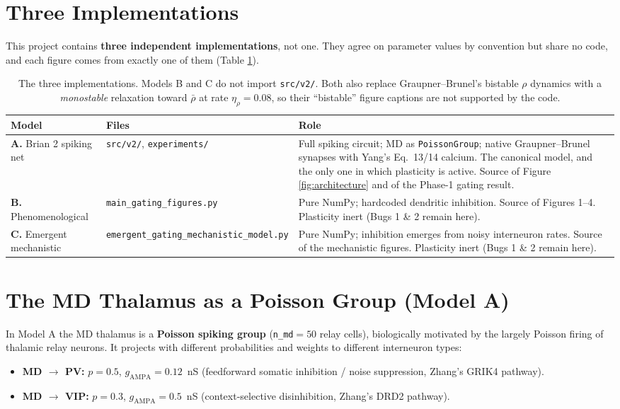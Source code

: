 \documentclass[11pt,a4paper]{article}
\begin{document}
\section{Three Implementations}
\label{sec:three}
This project contains \textbf{three independent implementations}, not one. They agree on
parameter values by convention but share no code, and each figure comes from exactly one
of them (Table \ref{tab:models}).

\begin{table}[H]
    \centering
    \small
    \begin{tabular}{@{}llp{6.2cm}@{}}
    \toprule
    \textbf{Model} & \textbf{Files} & \textbf{Role} \\ \midrule
    \textbf{A.} Brian 2 spiking net
      & \texttt{src/v2/}, \texttt{experiments/}
      & Full spiking circuit; MD as \texttt{PoissonGroup}; native Graupner--Brunel
        synapses with Yang's Eq.~13/14 calcium. The canonical model, and the only one in
        which plasticity is active. Source of Figure \ref{fig:architecture} and of the
        Phase-1 gating result. \\ \addlinespace
    \textbf{B.} Phenomenological
      & \texttt{main\_gating\_figures.py}
      & Pure NumPy; hardcoded dendritic inhibition. Source of Figures 1--4. Plasticity
        inert (Bugs 1 \& 2 remain here). \\ \addlinespace
    \textbf{C.} Emergent mechanistic
      & \texttt{emergent\_gating\_mechanistic\_model.py}
      & Pure NumPy; inhibition emerges from noisy interneuron rates. Source of the
        mechanistic figures. Plasticity inert (Bugs 1 \& 2 remain here). \\ \bottomrule
    \end{tabular}
    \caption{The three implementations. Models B and C do not import \texttt{src/v2/}.
    Both also replace Graupner--Brunel's bistable $\rho$ dynamics with a \emph{monostable}
    relaxation toward $\bar\rho$ at rate $\eta_\rho=0.08$, so their ``bistable'' figure
    captions are not supported by the code.}
    \label{tab:models}
\end{table}

\section{The MD Thalamus as a Poisson Group (Model A)}
\label{sec:poisson}
In Model A the MD thalamus is a \textbf{Poisson spiking group} (\texttt{n\_md}$=50$ relay
cells), biologically motivated by the largely Poisson firing of thalamic relay neurons. It
projects with different probabilities and weights to different interneuron types:
\begin{itemize}
    \item \textbf{MD $\rightarrow$ PV:} $p=0.5$, $g_{\text{AMPA}}=0.12$~nS (feedforward
      somatic inhibition / noise suppression, Zhang's GRIK4 pathway).
    \item \textbf{MD $\rightarrow$ VIP:} $p=0.3$, $g_{\text{AMPA}}=0.5$~nS
      (context-selective disinhibition, Zhang's DRD2 pathway).
\end{itemize}
\end{document}
